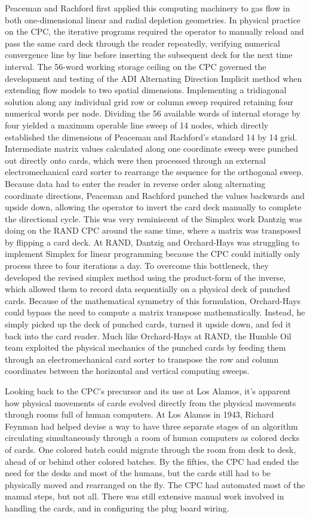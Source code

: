 Peaceman and Rachford first applied this computing machinery to gas flow in both one-dimensional linear and radial depletion geometries. In physical practice on the CPC, the iterative programs required the operator to manually reload and pass the same card deck through the reader repeatedly, verifying numerical convergence line by line before inserting the subsequent deck for the next time interval. The 56-word working storage ceiling on the CPC governed the development and testing of the ADI Alternating Direction Implicit method when extending flow models to two spatial dimensions. Implementing a tridiagonal solution along any individual grid row or column sweep required retaining four numerical words per node. Dividing the 56 available words of internal storage by four yielded a maximum operable line sweep of 14 nodes, which directly established the dimensions of Peaceman and Rachford's standard 14 by 14 grid. Intermediate matrix values calculated along one coordinate sweep were punched out directly onto cards, which were then processed through an external electromechanical card sorter to rearrange the sequence for the orthogonal sweep. Because data had to enter the reader in reverse order along alternating coordinate directions, Peaceman and Rachford punched the values backwards and upside down, allowing the operator to invert the card deck manually to complete the directional cycle. This was very reminiscent of the Simplex work Dantzig was doing on the RAND CPC around the same time, where a matrix was transposed by flipping a card deck. At RAND, Dantzig and Orchard-Hays was struggling to implement Simplex for linear programming because the CPC could initially only process three to four iterations a day. To overcome this bottleneck, they developed the revised simplex method using the product-form of the inverse, which allowed them to record data sequentially on a physical deck of punched cards. Because of the mathematical symmetry of this formulation, Orchard-Hays could bypass the need to compute a matrix transpose mathematically. Instead, he simply picked up the deck of punched cards, turned it upside down, and fed it back into the card reader. Much like Orchard-Hays at RAND, the Humble Oil team exploited the physical mechanics of the punched cards by feeding them through an electromechanical card sorter to transpose the row and column coordinates between the horizontal and vertical computing sweeps. \cite{bixbyBriefHistoryLinear2012}

Looking back to the CPC’s precursor and its use at Los Alamos, it’s apparent how physical movements of cards evolved directly from the physical movements through rooms full of human computers. At Los Alamos in 1943, Richard Feynman had helped devise a way to have three separate stages of an algorithm circulating simultaneously through a room of human computers as colored decks of cards. One colored batch could migrate through the room from desk to desk, ahead of or behind other colored batches. By the fifties, the CPC had ended the need for the desks and most of the humans, but the cards still had to be physically moved and rearranged on the fly. The CPC had automated most of the manual steps, but not all. There was still extensive manual work involved in handling the cards, and in configuring the plug board wiring.

